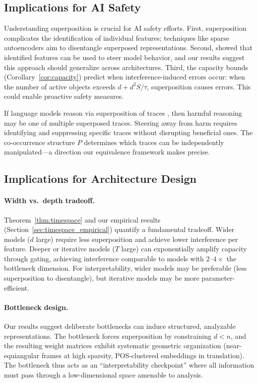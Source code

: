\subsection{Implications for AI Safety}

Understanding superposition is crucial for AI safety efforts. First, superposition complicates the identification of individual features; techniques like sparse autoencoders \citep{bricken2023monosemanticity} aim to disentangle superposed representations. Second, \citet{templeton2024scaling} showed that identified features can be used to steer model behavior, and our results suggest this approach should generalize across architectures. Third, the capacity bounds (Corollary~\ref{cor:capacity}) predict when interference-induced errors occur: when the number of active objects exceeds $d + d^2 S / \tau$, superposition causes errors. This could enable proactive safety measures.

If language models reason via superposition of traces \citep{zhu2025reasoning}, then harmful reasoning may be one of multiple superposed traces. Steering away from harm requires identifying and suppressing specific traces without disrupting beneficial ones. The co-occurrence structure $P$ determines which traces can be independently manipulated---a direction our equivalence framework makes precise.

\subsection{Implications for Architecture Design}

\paragraph{Width vs.\ depth tradeoff.} Theorem~\ref{thm:timespace} and our empirical results (Section~\ref{sec:timespace_empirical}) quantify a fundamental tradeoff. Wider models ($d$ large) require less superposition and achieve lower interference per feature. Deeper or iterative models ($T$ large) can exponentially amplify capacity through gating, achieving interference comparable to models with $2$--$4\times$ the bottleneck dimension. For interpretability, wider models may be preferable (less superposition to disentangle), but iterative models may be more parameter-efficient.

\paragraph{Bottleneck design.} Our results suggest deliberate bottlenecks can induce structured, analyzable representations. The bottleneck forces superposition by constraining $d < n$, and the resulting weight matrices exhibit systematic geometric organization (near-equiangular frames at high sparsity, POS-clustered embeddings in translation). The bottleneck thus acts as an ``interpretability checkpoint'' where all information must pass through a low-dimensional space amenable to analysis.

